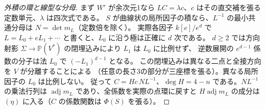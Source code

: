 \begin{proof}[外積の環と線型な分母]
まず $W'$ が余次元1なら $LC=\lambda c$、$c$ はその直交補を張る定数単元、$\lambda$ は四次式である。
$S$ が曲線状の局所因子の積なら、$L^{-1}$ の最小共通分母は $N=\det m_L$（定数倍を除く）。
実際各因子 $k[e]/e^d$ で $L=L_0+eL_1+\cdots$ と書くと、$L_0$ に沿う極は正確に $d$ 次である。
$d\ge2$ では方向射影 $\Sigma\to\mathbb P(V^*)$ の閉埋込みにより $L_1$ は $L_0$ に比例せず、
逆数展開の $e^{d-1}$ 係数の分子は法 $L_0$ で $(-L_1)^{d-1}$ となる。
この閉埋込みは異なる二点と全接方向を $V$ が分離することによる
（任意の長さ3の部分が三座標を張る）。異なる局所因子の $L_0$ は比例しない。
従って $C=H c\,N L^{-1}$、$\deg H=4-n$ である。$NL^{-1}$ の乗法行列は
$\operatorname{adj}m_L$ であり、全係数を実際の点環に戻すと
$H\operatorname{adj}m_L$ の成分は $(\eta)$ に入る（$C$ の係数関数は $\Phi(S)$ を張る）。
\end{proof}

